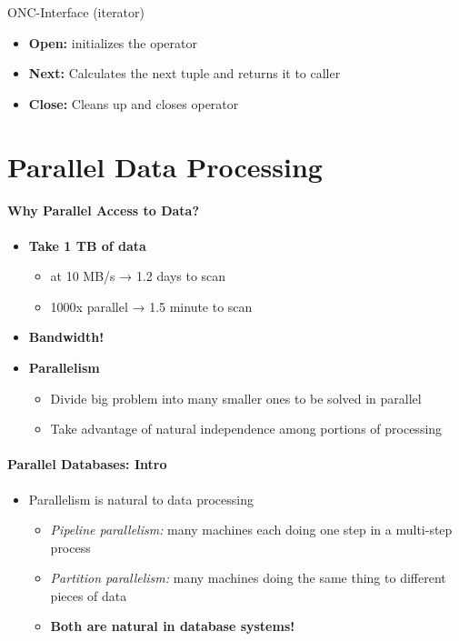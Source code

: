 ONC-Interface (iterator)
\begin{itemize}
\item \textbf{Open:} initializes the operator
\item \textbf{Next:} Calculates the next tuple and returns it to caller
\item \textbf{Close:} Cleans up and closes operator
\end{itemize}


\section{Parallel Data Processing}

\paragraph{Why Parallel Access to Data?}
\begin{itemize}
\item \textbf{Take 1 TB of data}
  \begin{itemize}
  \item at 10 MB/s → 1.2 days to scan
  \item 1000x parallel → 1.5 minute to scan
  \end{itemize}
\item \textbf{Bandwidth!}
\item \textbf{Parallelism}
  \begin{itemize}
  \item Divide big problem into many smaller ones to be
    solved in parallel
  \item Take advantage of natural independence among
    portions of processing
  \end{itemize}
\end{itemize}


\paragraph{Parallel Databases: Intro}

\begin{itemize}
\item Parallelism is natural to data processing
  \begin{itemize}
  \item \textit{Pipeline parallelism:} many machines each doing
    one step in a multi-step process
  \item \textit{Partition parallelism:} many machines doing the
    same thing to different pieces of data
  \item \textbf{Both are natural in database systems!}
  \end{itemize}
\end{itemize}


